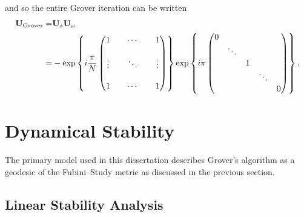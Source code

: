and so the entire Grover iteration can be written
\begin{equation}
\begin{split}
{\bf U}_{\text{Grover}} =& {\bf U}_s {\bf U}_\omega\\ 
=& - \exp \left\lbrace  i\frac{\pi}{N}
                \begin{pmatrix}
                    1      &        & \cdots &      & 1 \\
                    \\
                    \vdots &        & \ddots &      & \vdots \\
                    \\
                    1      &        & \cdots &      & 1
                \end{pmatrix}
\right\rbrace
\exp \left\lbrace  i\pi
                \begin{pmatrix}
                    0       &        &        &        &  \\
                            & \ddots &        &        &  \\
                            &        & 1      &        &  \\
                            &        &        & \ddots &  \\
                            &        &        &        & 0
                \end{pmatrix}
\right\rbrace.
\end{split}
\end{equation}




\section{Dynamical Stability}
\label{sec:dynamicalStability}
%


The primary model used in this dissertation describes 
Grover's algorithm as a geodesic of the Fubini--Study metric 
as discussed in the previous section.%

\subsection{Linear Stability Analysis}

